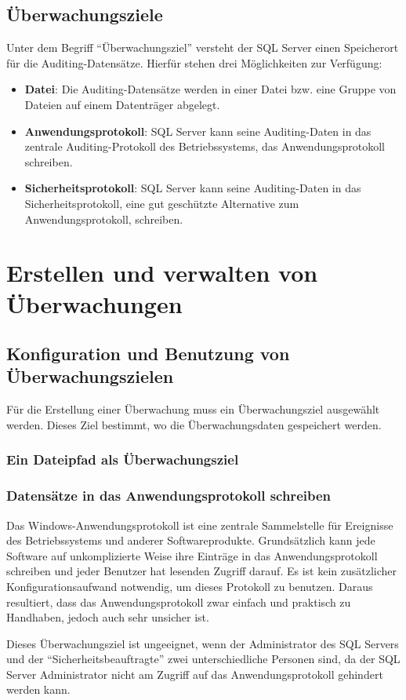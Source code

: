       \subsection{Überwachungsziele}
        Unter dem Begriff \enquote{Überwachungsziel} versteht der SQL Server
        einen Speicherort für die Auditing-Datensätze. Hierfür stehen drei
        Möglichkeiten zur Verfügung:
        \begin{itemize}
          \item \textbf{Datei}: Die Auditing-Datensätze werden in einer Datei
          bzw. eine Gruppe von Dateien auf einem Datenträger abgelegt.
          \item \textbf{Anwendungsprotokoll}: SQL Server kann seine
          Auditing-Daten in das zentrale Auditing-Protokoll des
          Betriebssystems, das Anwendungsprotokoll schreiben.
          \item \textbf{Sicherheitsprotokoll}: SQL Server kann seine
          Auditing-Daten in das Sicherheitsprotokoll, eine gut geschützte
          Alternative zum Anwendungsprotokoll, schreiben.
        \end{itemize}
    \section{Erstellen und verwalten von Überwachungen}
      \subsection{Konfiguration und Benutzung von Überwachungszielen}
        Für die Erstellung einer Überwachung muss ein Überwachungsziel
        ausgewählt werden. Dieses Ziel bestimmt, wo die Überwachungsdaten
        gespeichert werden.
        \subsubsection{Ein Dateipfad als Überwachungsziel}
        
        \subsubsection{Datensätze in das Anwendungsprotokoll schreiben}
          Das Windows-Anwendungsprotokoll ist eine zentrale Sammelstelle für
          Ereignisse des Betriebssystems und anderer Softwareprodukte.
          Grundsätzlich kann jede Software auf unkomplizierte Weise ihre
          Einträge in das Anwendungsprotokoll schreiben und jeder Benutzer hat
          lesenden Zugriff darauf. Es ist kein zusätzlicher
          Konfigurationsaufwand notwendig, um dieses Protokoll zu
          benutzen. Daraus resultiert, dass das Anwendungsprotokoll zwar einfach
          und praktisch zu Handhaben, jedoch auch sehr unsicher ist.
          \begin{merke}
            Dieses Überwachungsziel ist ungeeignet, wenn der Administrator des
            SQL Servers und der \enquote{Sicherheitsbeauftragte} zwei
            unterschiedliche Personen sind, da der SQL Server Administrator
            nicht am Zugriff auf das Anwendungsprotokoll gehindert werden kann.
          \end{merke}
